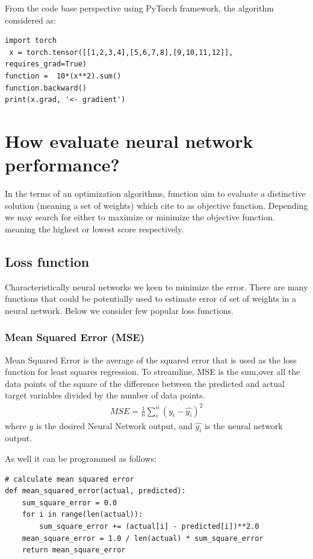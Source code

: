 From the code base perspective using PyTorch framework, the algorithm considered as:
\begin{lstlisting}
import torch
 x = torch.tensor([[1,2,3,4],[5,6,7,8],[9,10,11,12]],                requires_grad=True) 
function =  10*(x**2).sum()
function.backward()
print(x.grad, '<- gradient')
\end{lstlisting}

\section{How evaluate neural network performance?}
In the terms of an optimization algorithms, function aim to evaluate a distinctive solution (meaning a set of weights) which cite to as objective function. Depending we may search for either to maximize or minimize the objective function. meaning the highest or lowest score respectively.
\subsection{Loss function}
Characteristically neural networks we keen to minimize the error. There are many functions that could be potentially used to estimate error of set of weights in a neural network. Below we consider few popular loss functions.

\subsubsection{Mean Squared Error (MSE)}
Mean Squared Error is the average of the squared error that is used as the loss function for least squares regression. To streamline, MSE is the sum,over all the data points of the square of the difference between the predicted and actual target variables divided by the number of data points.
\begin{align*}
MSE = \frac{{1}}{n} \sum_{i}^{n} (y_i - \widehat{y_i})^2
\end{align*}
where $y$ is the desired Neural Network output, and $\widehat{y_i}$ is the neural network output.

As well it can be programmed as follows:
\begin{lstlisting}
# calculate mean squared error
def mean_squared_error(actual, predicted):
	sum_square_error = 0.0
	for i in range(len(actual)):
		sum_square_error += (actual[i] - predicted[i])**2.0
	mean_square_error = 1.0 / len(actual) * sum_square_error
	return mean_square_error
\end{lstlisting}

